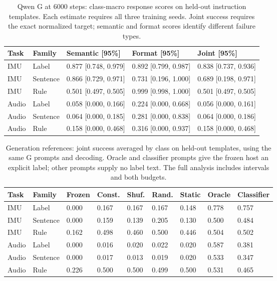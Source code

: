 \begin{table}[!htbp]\centering\small
\setlength{\tabcolsep}{4pt}
\caption{Qwen G at 6000 steps: class-macro response scores on held-out instruction templates. Each estimate requires all three training seeds. Joint success requires the exact normalized target; semantic and format scores identify different failure types.}\label{tab:generation}
\begin{tabular}{@{}lllll@{}}
\toprule
Task & Family & Semantic [95\%] & Format [95\%] & Joint [95\%] \\
\midrule
IMU & Label & 0.877 [0.748, 0.979] & 0.892 [0.799, 0.987] & 0.838 [0.737, 0.936] \\
IMU & Sentence & 0.866 [0.729, 0.971] & 0.731 [0.196, 1.000] & 0.689 [0.198, 0.971] \\
IMU & Rule & 0.501 [0.497, 0.505] & 0.999 [0.998, 1.000] & 0.501 [0.497, 0.505] \\
Audio & Label & 0.058 [0.000, 0.166] & 0.224 [0.000, 0.668] & 0.056 [0.000, 0.161] \\
Audio & Sentence & 0.064 [0.000, 0.185] & 0.281 [0.000, 0.838] & 0.064 [0.000, 0.186] \\
Audio & Rule & 0.158 [0.000, 0.468] & 0.316 [0.000, 0.937] & 0.158 [0.000, 0.468] \\
\bottomrule
\end{tabular}
\end{table}\par
\begin{table}[!htbp]\centering\small
\setlength{\tabcolsep}{4pt}
\caption{Generation references: joint success averaged by class on held-out templates, using the same G prompts and decoding. Oracle and classifier prompts give the frozen host an explicit label; other prompts supply no label text. The full analysis includes intervals and both budgets.}\label{tab:generation-controls}
\begin{tabular}{@{}lllllllll@{}}
\toprule
Task & Family & Frozen & Const. & Shuf. & Rand. & Static & Oracle & Classifier \\
\midrule
IMU & Label & 0.000 & 0.167 & 0.167 & 0.167 & 0.148 & 0.778 & 0.757 \\
IMU & Sentence & 0.000 & 0.159 & 0.139 & 0.205 & 0.130 & 0.500 & 0.484 \\
IMU & Rule & 0.162 & 0.498 & 0.460 & 0.500 & 0.446 & 0.504 & 0.502 \\
Audio & Label & 0.000 & 0.016 & 0.020 & 0.022 & 0.020 & 0.587 & 0.381 \\
Audio & Sentence & 0.000 & 0.017 & 0.013 & 0.019 & 0.020 & 0.533 & 0.347 \\
Audio & Rule & 0.226 & 0.500 & 0.500 & 0.499 & 0.500 & 0.531 & 0.465 \\
\bottomrule
\end{tabular}
\end{table}\par
